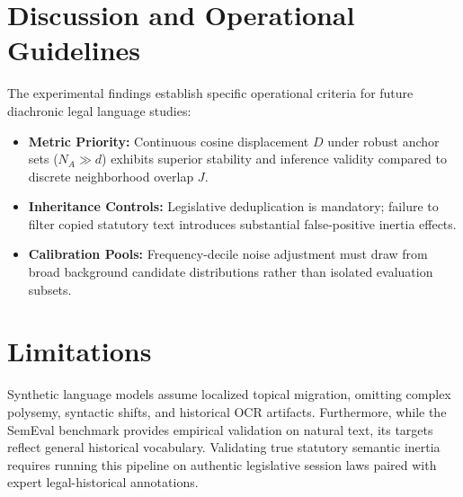 \documentclass[conference]{IEEEtran}
\begin{document}
\begin{table}[t]
\caption{SemEval-2020 English: Spearman Rank Correlation With Human Gold Scores ($n=37$, Two-Sided $p$-Value in Parentheses)}
\label{tab:semeval}
\centering
\setlength{\tabcolsep}{3.0pt}
\small
{}
\end{table}


\section{Discussion and Operational Guidelines}
The experimental findings establish specific operational criteria for future diachronic legal language studies:
\begin{itemize}
    \item \textbf{Metric Priority:} Continuous cosine displacement $D$ under robust anchor sets ($N_A \gg d$) exhibits superior stability and inference validity compared to discrete neighborhood overlap $J$.
    \item \textbf{Inheritance Controls:} Legislative deduplication is mandatory; failure to filter copied statutory text introduces substantial false-positive inertia effects.
    \item \textbf{Calibration Pools:} Frequency-decile noise adjustment must draw from broad background candidate distributions rather than isolated evaluation subsets.
\end{itemize}

\section{Limitations}
Synthetic language models assume localized topical migration, omitting complex polysemy, syntactic shifts, and historical OCR artifacts. Furthermore, while the SemEval benchmark provides empirical validation on natural text, its targets reflect general historical vocabulary. Validating true statutory semantic inertia requires running this pipeline on authentic legislative session laws paired with expert legal-historical annotations.
\end{document}
